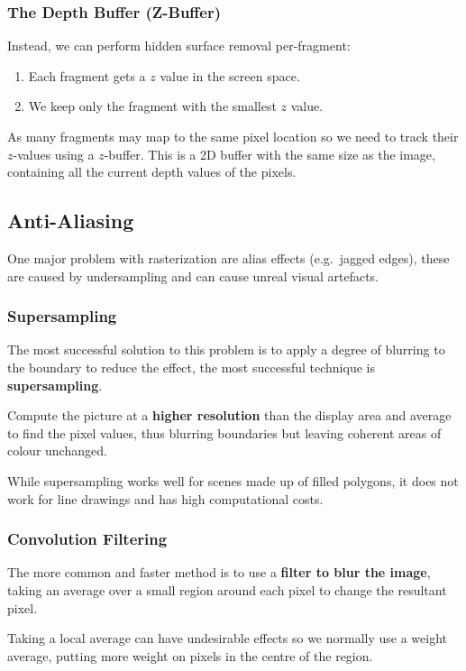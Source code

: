 \documentclass[11pt]{article}
\begin{document}
\subsubsection{The Depth Buffer (Z-Buffer)}
Instead, we can perform hidden surface removal per-fragment:
\begin{enumerate}
  \item Each fragment gets a $z$ value in the screen space.
  \item We keep only the fragment with the smallest $z$ value.
\end{enumerate}
As many fragments may map to the same pixel location so we need to track their $z$-values using a $z$-buffer.
This is a 2D buffer with the same size as the image, containing all the current depth values of the pixels.

\subsection{Anti-Aliasing}
One major problem with rasterization are alias effects (e.g.\ jagged edges), these are caused by undersampling and can cause unreal visual artefacts.


\subsubsection{Supersampling}
The most successful solution to this problem is to apply a degree of blurring to the boundary to reduce the effect, the most successful technique is \textbf{supersampling}.

Compute the picture at a \textbf{higher resolution} than the display area and average to find the pixel values, thus blurring boundaries but leaving coherent areas of colour unchanged.

While supersampling works well for scenes made up of filled polygons, it does not work for line drawings and has high computational costs.

\subsubsection{Convolution Filtering}
The more common and faster method is to use a \textbf{filter to blur the image}, taking an average over a small region around each pixel to change the resultant pixel.

Taking a local average can have undesirable effects so we normally use a weight average, putting more weight on pixels in the centre of the region.
\end{document}
